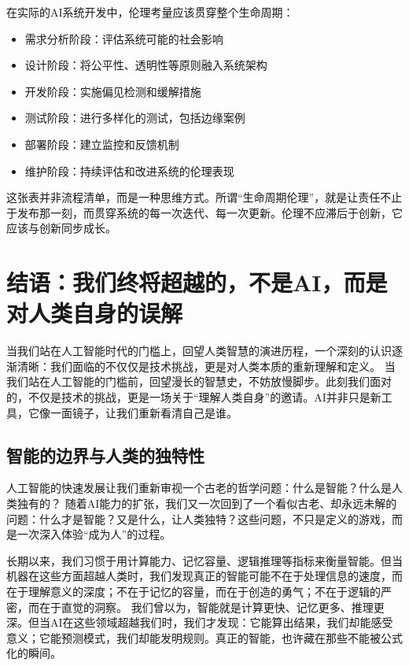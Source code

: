 在实际的AI系统开发中，伦理考量应该贯穿整个生命周期：
\begin{itemize}
\item 需求分析阶段：评估系统可能的社会影响
\item 设计阶段：将公平性、透明性等原则融入系统架构
\item 开发阶段：实施偏见检测和缓解措施
\item 测试阶段：进行多样化的测试，包括边缘案例
\item 部署阶段：建立监控和反馈机制
\item 维护阶段：持续评估和改进系统的伦理表现
\end{itemize}
这张表并非流程清单，而是一种思维方式。所谓“生命周期伦理”，就是让责任不止于发布那一刻，而贯穿系统的每一次迭代、每一次更新。伦理不应滞后于创新，它应该与创新同步成长。

\section*{结语：我们终将超越的，不是AI，而是对人类自身的误解}

当我们站在人工智能时代的门槛上，回望人类智慧的演进历程，一个深刻的认识逐渐清晰：我们面临的不仅仅是技术挑战，更是对人类本质的重新理解和定义。
当我们站在人工智能的门槛前，回望漫长的智慧史，不妨放慢脚步。此刻我们面对的，不仅是技术的挑战，更是一场关于“理解人类自身”的邀请。AI并非只是新工具，它像一面镜子，让我们重新看清自己是谁。

\subsection*{智能的边界与人类的独特性}

人工智能的快速发展让我们重新审视一个古老的哲学问题：什么是智能？什么是人类独有的？
随着AI能力的扩张，我们又一次回到了一个看似古老、却永远未解的问题：什么才是智能？又是什么，让人类独特？这些问题，不只是定义的游戏，而是一次深入体验“成为人”的过程。

长期以来，我们习惯于用计算能力、记忆容量、逻辑推理等指标来衡量智能。但当机器在这些方面超越人类时，我们发现真正的智能可能不在于处理信息的速度，而在于理解意义的深度；不在于记忆的容量，而在于创造的勇气；不在于逻辑的严密，而在于直觉的洞察。
我们曾以为，智能就是计算更快、记忆更多、推理更深。但当AI在这些领域超越我们时，我们才发现：它能算出结果，我们却能感受意义；它能预测模式，我们却能发明规则。真正的智能，也许藏在那些不能被公式化的瞬间。

